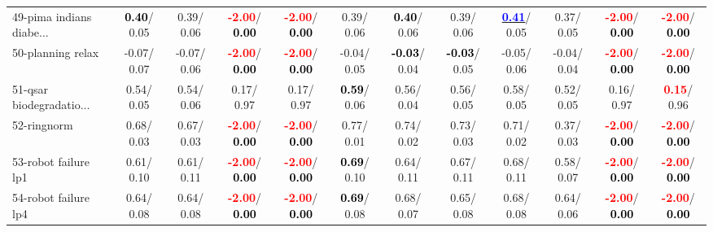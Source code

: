\begin{table}[h]
\begin{center}
{\begin{tabular}{lc|c|c|c|c|c|c|c|c|c|c}
49-pima indians diabe... & \textcolor{black}{\textbf{  0.40}}/  0.05 &   0.39/  0.06 & \textcolor{red}{\textbf{ -2.00}}/\textcolor{black}{\textbf{  0.00}} & \textcolor{red}{\textbf{ -2.00}}/\textcolor{black}{\textbf{  0.00}} &   0.39/  0.06 & \textcolor{black}{\textbf{  0.40}}/  0.06 &   0.39/  0.06 & \underline{\textcolor{blue}{\textbf{  0.41}}}/  0.05 &   0.37/  0.05 & \textcolor{red}{\textbf{ -2.00}}/\textcolor{black}{\textbf{  0.00}} & \textcolor{red}{\textbf{ -2.00}}/\textcolor{black}{\textbf{  0.00}} \\
50-planning relax &  -0.07/  0.07 &  -0.07/  0.06 & \textcolor{red}{\textbf{ -2.00}}/\textcolor{black}{\textbf{  0.00}} & \textcolor{red}{\textbf{ -2.00}}/\textcolor{black}{\textbf{  0.00}} &  -0.04/  0.05 & \textcolor{black}{\textbf{ -0.03}}/  0.04 & \textcolor{black}{\textbf{ -0.03}}/  0.05 &  -0.05/  0.06 &  -0.04/  0.04 & \textcolor{red}{\textbf{ -2.00}}/\textcolor{black}{\textbf{  0.00}} & \textcolor{red}{\textbf{ -2.00}}/\textcolor{black}{\textbf{  0.00}} \\
51-qsar biodegradatio... &   0.54/  0.05 &   0.54/  0.06 &   0.17/  0.97 &   0.17/  0.97 & \textcolor{black}{\textbf{  0.59}}/  0.06 &   0.56/  0.04 &   0.56/  0.05 &   0.58/  0.05 &   0.52/  0.05 &   0.16/  0.97 & \textcolor{red}{\textbf{  0.15}}/  0.96 \\
52-ringnorm &   0.68/  0.03 &   0.67/  0.03 & \textcolor{red}{\textbf{ -2.00}}/\textcolor{black}{\textbf{  0.00}} & \textcolor{red}{\textbf{ -2.00}}/\textcolor{black}{\textbf{  0.00}} &   0.77/  0.01 &   0.74/  0.02 &   0.73/  0.03 &   0.71/  0.02 &   0.37/  0.03 & \textcolor{red}{\textbf{ -2.00}}/\textcolor{black}{\textbf{  0.00}} & \textcolor{red}{\textbf{ -2.00}}/\textcolor{black}{\textbf{  0.00}} \\
53-robot failure lp1 &   0.61/  0.10 &   0.61/  0.11 & \textcolor{red}{\textbf{ -2.00}}/\textcolor{black}{\textbf{  0.00}} & \textcolor{red}{\textbf{ -2.00}}/\textcolor{black}{\textbf{  0.00}} & \textcolor{black}{\textbf{  0.69}}/  0.10 &   0.64/  0.11 &   0.67/  0.11 &   0.68/  0.11 &   0.58/  0.07 & \textcolor{red}{\textbf{ -2.00}}/\textcolor{black}{\textbf{  0.00}} & \textcolor{red}{\textbf{ -2.00}}/\textcolor{black}{\textbf{  0.00}} \\ \hline
54-robot failure lp4 &   0.64/  0.08 &   0.64/  0.08 & \textcolor{red}{\textbf{ -2.00}}/\textcolor{black}{\textbf{  0.00}} & \textcolor{red}{\textbf{ -2.00}}/\textcolor{black}{\textbf{  0.00}} & \textcolor{black}{\textbf{  0.69}}/  0.08 &   0.68/  0.07 &   0.65/  0.08 &   0.68/  0.08 &   0.64/  0.06 & \textcolor{red}{\textbf{ -2.00}}/\textcolor{black}{\textbf{  0.00}} & \textcolor{red}{\textbf{ -2.00}}/\textcolor{black}{\textbf{  0.00}} \\

\end{tabular}}
\end{center}
\end{table}
